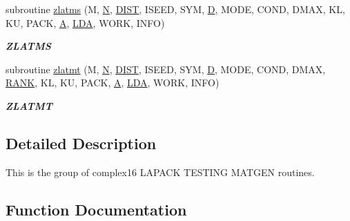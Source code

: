 \begin{DoxyCompactItemize}
subroutine \hyperlink{group__complex16__matgen_ga0c0eb38dc5f769378bf4d4ec4918d857}{zlatms} (M, \hyperlink{polmisc_8c_a0240ac851181b84ac374872dc5434ee4}{N}, \hyperlink{superlu__enum__consts_8h_af00a42ecad444bbda75cde1b64bd7e72ac04fbbdf0d80a4ad25e565541deeebd7}{D\+I\+S\+T}, I\+S\+E\+E\+D, S\+Y\+M, \hyperlink{odrpack_8h_a7dae6ea403d00f3687f24a874e67d139}{D}, M\+O\+D\+E, C\+O\+N\+D, D\+M\+A\+X, K\+L, K\+U, P\+A\+C\+K, \hyperlink{classA}{A}, \hyperlink{example__user_8c_ae946da542ce0db94dced19b2ecefd1aa}{L\+D\+A}, W\+O\+R\+K, I\+N\+F\+O)
\begin{DoxyCompactList}\small\item\em {\bfseries Z\+L\+A\+T\+M\+S} \end{DoxyCompactList}\item 
subroutine \hyperlink{group__complex16__matgen_ga11048512b57a4efb13379143f3b27881}{zlatmt} (M, \hyperlink{polmisc_8c_a0240ac851181b84ac374872dc5434ee4}{N}, \hyperlink{superlu__enum__consts_8h_af00a42ecad444bbda75cde1b64bd7e72ac04fbbdf0d80a4ad25e565541deeebd7}{D\+I\+S\+T}, I\+S\+E\+E\+D, S\+Y\+M, \hyperlink{odrpack_8h_a7dae6ea403d00f3687f24a874e67d139}{D}, M\+O\+D\+E, C\+O\+N\+D, D\+M\+A\+X, \hyperlink{splinemodule_8c_a3a88bcc63386de30443dacede2e01847}{R\+A\+N\+K}, K\+L, K\+U, P\+A\+C\+K, \hyperlink{classA}{A}, \hyperlink{example__user_8c_ae946da542ce0db94dced19b2ecefd1aa}{L\+D\+A}, W\+O\+R\+K, I\+N\+F\+O)
\begin{DoxyCompactList}\small\item\em {\bfseries Z\+L\+A\+T\+M\+T} \end{DoxyCompactList}\end{DoxyCompactItemize}


\subsection{Detailed Description}
This is the group of complex16 L\+A\+P\+A\+C\+K T\+E\+S\+T\+I\+N\+G M\+A\+T\+G\+E\+N routines. 

\subsection{Function Documentation}
\hypertarget{group__complex16__matgen_gaeb5ac1c437527a2ed37e9378d6ed3182}{}
